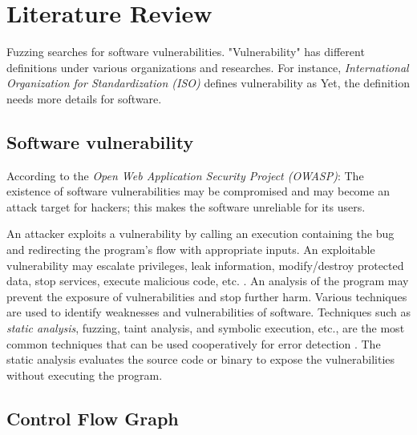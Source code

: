 \section{Literature Review} \label{sec:2-lit}

Fuzzing searches for software vulnerabilities. "Vulnerability" has different definitions under various organizations and researches. For instance, \textit{International Organization for Standardization (ISO)} defines vulnerability as  \cite{iso27008} Yet, the definition needs more details for software. 

\subsection{Software vulnerability}
\label{sec:2.2.1}

According to the \textit{Open Web Application Security Project (OWASP)}:  The existence of software vulnerabilities may be compromised and may become an attack target for hackers; this makes the software unreliable for its users.

An attacker exploits a vulnerability by calling an execution containing the bug and redirecting the program's flow with appropriate inputs. An exploitable vulnerability may escalate privileges, leak information, modify/destroy protected data, stop services, execute malicious code, etc. \cite{chang2011trend}. An analysis of the program may prevent the exposure of vulnerabilities and stop further harm. Various techniques are used to identify weaknesses and vulnerabilities of software. Techniques such as \textit{static analysis}, fuzzing, taint analysis, and symbolic execution, etc., are the most common techniques that can be used cooperatively for error detection \cite{su2016vuldetection}. The static analysis evaluates the source code or binary to expose the vulnerabilities without executing the program.

\subsection{Control Flow Graph}

